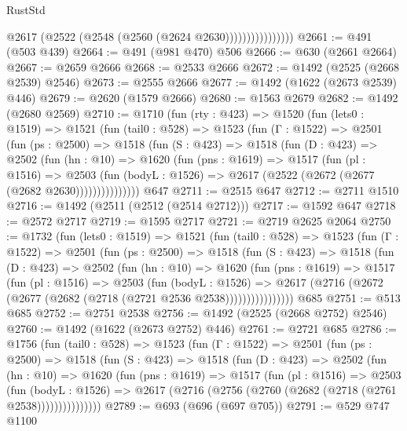 \begin{lexlean}{RustStd}
\begin{coremodule}
                          @2617 (@2522 (@2548 (@2560 (@2624 @2630))))))))))))))))
@2661 := @491 (@503 @439)
@2664 := @491 (@981 @470) @506
@2666 := @630 (@2661 @2664)
@2667 := @2659 @2666
@2668 := @2533 @2666
@2672 := @1492 (@2525 (@2668 @2539) @2546)
@2673 := @2555 @2666
@2677 := @1492 (@1622 (@2673 @2539) @446)
@2679 := @2620 (@1579 @2666)
@2680 := @1563 @2679
@2682 := @1492 (@2680 @2569)
@2710 := @1710
    (fun (rty : @423) =>
    @1520
      (fun (lets0 : @1519) =>
      @1521
        (fun (tail0 : @528) =>
        @1523
          (fun (Γ : @1522) =>
          @2501
            (fun (ps : @2500) =>
            @1518
              (fun (S : @423) =>
              @1518
                (fun (D : @423) =>
                @2502
                  (fun (hn : @10) =>
                  @1620
                    (fun (pns : @1619) =>
                    @1517
                      (fun (pl : @1516) =>
                      @2503
                        (fun (bodyL : @1526) =>
                        @2617 (@2522 (@2672 (@2677 (@2682 @2630)))))))))))))))
    @647
@2711 := @2515 @647
@2712 := @2711 @1510
@2716 := @1492 (@2511 (@2512 (@2514 @2712)))
@2717 := @1592 @647
@2718 := @2572 @2717
@2719 := @1595 @2717
@2721 := @2719 @2625 @2064
@2750 := @1732
    (fun (lets0 : @1519) =>
    @1521
      (fun (tail0 : @528) =>
      @1523
        (fun (Γ : @1522) =>
        @2501
          (fun (ps : @2500) =>
          @1518
            (fun (S : @423) =>
            @1518
              (fun (D : @423) =>
              @2502
                (fun (hn : @10) =>
                @1620
                  (fun (pns : @1619) =>
                  @1517
                    (fun (pl : @1516) =>
                    @2503
                      (fun (bodyL : @1526) =>
                      @2617 (@2716 (@2672 (@2677 (@2682 (@2718 (@2721 @2536 @2538))))))))))))))))
    @685
@2751 := @513 @685
@2752 := @2751 @2538
@2756 := @1492 (@2525 (@2668 @2752) @2546)
@2760 := @1492 (@1622 (@2673 @2752) @446)
@2761 := @2721 @685
@2786 := @1756
    (fun (tail0 : @528) =>
    @1523
      (fun (Γ : @1522) =>
      @2501
        (fun (ps : @2500) =>
        @1518
          (fun (S : @423) =>
          @1518
            (fun (D : @423) =>
            @2502
              (fun (hn : @10) =>
              @1620
                (fun (pns : @1619) =>
                @1517
                  (fun (pl : @1516) =>
                  @2503
                    (fun (bodyL : @1526) =>
                    @2617 (@2716 (@2756 (@2760 (@2682 (@2718 (@2761 @2538)))))))))))))))
@2789 := @693 (@696 (@697 @705))
@2791 := @529 @747 @1100

\end{coremodule}
\end{lexlean}

